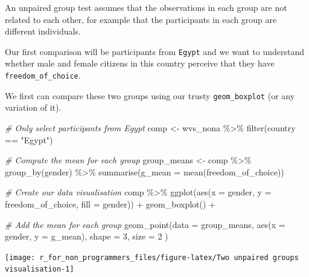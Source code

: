 \documentclass[
]{book}
\newenvironment{Shaded}{\begin{snugshade}}{\end{snugshade}}
\newcommand{\AttributeTok}[1]{\textcolor[rgb]{0.77,0.63,0.00}{#1}}
\newcommand{\CommentTok}[1]{\textcolor[rgb]{0.56,0.35,0.01}{\textit{#1}}}
\newcommand{\DecValTok}[1]{\textcolor[rgb]{0.00,0.00,0.81}{#1}}
\newcommand{\FunctionTok}[1]{\textcolor[rgb]{0.00,0.00,0.00}{#1}}
\newcommand{\NormalTok}[1]{#1}
\newcommand{\OtherTok}[1]{\textcolor[rgb]{0.56,0.35,0.01}{#1}}
\newcommand{\SpecialCharTok}[1]{\textcolor[rgb]{0.00,0.00,0.00}{#1}}
\newcommand{\StringTok}[1]{\textcolor[rgb]{0.31,0.60,0.02}{#1}}
\begin{document}
An unpaired group test assumes that the observations in each group are not related to each other, for example that the participants in each group are different individuals.

Our first comparison will be participants from \texttt{Egypt} and we want to understand whether male and female citizens in this country perceive that they have \texttt{freedom\_of\_choice}.

We first can compare these two groups using our trusty \texttt{geom\_boxplot} (or any variation of it).

\begin{Shaded}
\begin{Highlighting}[]
\CommentTok{\# Only select participants from \textquotesingle{}Egypt\textquotesingle{}}
\NormalTok{comp }\OtherTok{\textless{}{-}}\NormalTok{ wvs\_nona }\SpecialCharTok{\%\textgreater{}\%}
  \FunctionTok{filter}\NormalTok{(country }\SpecialCharTok{==} \StringTok{"Egypt"}\NormalTok{)}

\CommentTok{\# Compute the mean for each group}
\NormalTok{group\_means }\OtherTok{\textless{}{-}}\NormalTok{ comp }\SpecialCharTok{\%\textgreater{}\%} 
  \FunctionTok{group\_by}\NormalTok{(gender) }\SpecialCharTok{\%\textgreater{}\%} 
  \FunctionTok{summarise}\NormalTok{(}\AttributeTok{g\_mean =} \FunctionTok{mean}\NormalTok{(freedom\_of\_choice))}

\CommentTok{\# Create our data visualisation}
\NormalTok{comp }\SpecialCharTok{\%\textgreater{}\%} 
  \FunctionTok{ggplot}\NormalTok{(}\FunctionTok{aes}\NormalTok{(}\AttributeTok{x =}\NormalTok{ gender, }\AttributeTok{y =}\NormalTok{ freedom\_of\_choice, }\AttributeTok{fill =}\NormalTok{ gender)) }\SpecialCharTok{+}
  \FunctionTok{geom\_boxplot}\NormalTok{() }\SpecialCharTok{+}
  
  \CommentTok{\# Add the mean for each group}
  \FunctionTok{geom\_point}\NormalTok{(}\AttributeTok{data =}\NormalTok{ group\_means,}
             \FunctionTok{aes}\NormalTok{(}\AttributeTok{x =}\NormalTok{ gender, }\AttributeTok{y =}\NormalTok{ g\_mean),}
             \AttributeTok{shape =} \DecValTok{3}\NormalTok{,}
             \AttributeTok{size =} \DecValTok{2}
\NormalTok{             )}
\end{Highlighting}
\end{Shaded}

\begin{center}\texttt{[image: r\_for\_non\_programmers\_files/figure-latex/Two unpaired groups visualisation-1]} \end{center}
\end{document}
